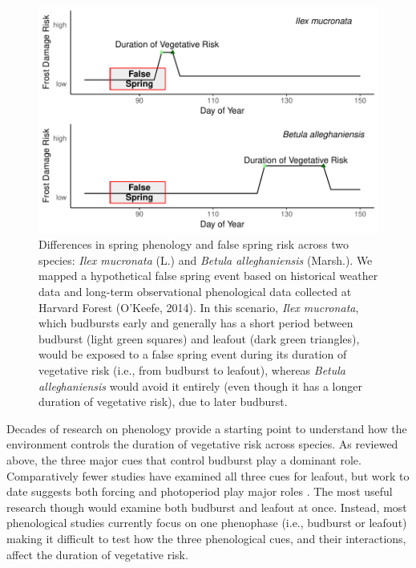 \documentclass{article}\usepackage[]{graphicx}\usepackage[]{color}
\makeatletter
\def\maxwidth{ %
  \ifdim\Gin@nat@width>\linewidth
    \linewidth
  \else
    \Gin@nat@width
  \fi
}
\makeatother
\begin{document}
\begin{figure}[H]

{\centering \includegraphics[width=\maxwidth]{figure/risk-1} 

}

\caption{Differences in spring phenology and false spring risk across two species: \textit{Ilex mucronata} (L.) and \textit{Betula alleghaniensis} (Marsh.). We mapped a hypothetical false spring event based on historical weather data and long-term observational phenological data collected at Harvard Forest (O'Keefe, 2014). In this scenario, \textit{Ilex mucronata}, which budbursts early and generally has a short period between budburst (light green squares) and leafout (dark green triangles), would be exposed to a false spring event during its duration of vegetative risk (i.e., from budburst to leafout), whereas \textit{Betula alleghaniensis} would avoid it entirely (even though it has a longer duration of vegetative risk), due to later budburst.}\label{fig:risk}
\end{figure}



Decades of research on phenology provide a starting point to understand how the environment controls the duration of vegetative risk across species. As reviewed above, the three major cues that control budburst \citep[e.g., low winter temperatures, warm spring temperatures, and increasing photoperiods,][]
{Chuine2010} play a dominant role. Comparatively fewer studies have examined all three cues for leafout, but work to date suggests both forcing and photoperiod play major roles \citep{Basler2014, Flynn2018}. The most useful research though would examine both budburst and leafout at once. Instead, most phenological studies currently focus on one phenophase (i.e., budburst or leafout) making it difficult to test how the three phenological cues, and their interactions, affect the duration of vegetative risk.  
\end{document}
